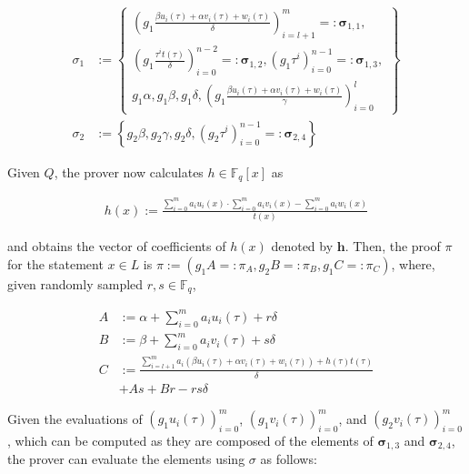 \documentclass{article}
\begin{document}
\begin{adjustbox}{max width=.5\textwidth}
\parbox{\linewidth}{
\begin{align*}
        \sigma_1 &:= \left\{\begin{aligned}\left(g_1\frac{\beta u_i(\tau) + \alpha v_i(\tau) + w_i(\tau)}{\delta}\right)_{i=l+1}^m =: \boldsymbol\sigma_{1,1},\\
        \left(g_1\frac{\tau^i t(\tau)}{\delta}\right)_{i=0}^{n-2} =: \boldsymbol\sigma_{1,2}, \left(g_1{\tau^i}\right)_{i=0}^{n-1} =: \boldsymbol\sigma_{1,3},\\
        g_1\alpha, g_1\beta, g_1\delta, \left(g_1\frac{\beta u_i(\tau) + \alpha v_i(\tau) + w_i(\tau)}{\gamma}\right)_{i=0}^l\end{aligned}\right\} \\
        \sigma_2 &:= \left\{g_2\beta, g_2\gamma, g_2\delta, (g_2{\tau^i})_{i=0}^{n-1} =: \boldsymbol\sigma_{2,4}\right\}
\end{align*}}
\end{adjustbox}

Given $Q$, the prover now calculates $h \in \mathbb{F}_q[x]$ as

\begin{align}h(x) := \frac{\sum_{i=0}^m a_iu_i(x) \cdot \sum_{i=0}^m a_iv_i(x) - \sum_{i=0}^{m} a_iw_i(x)}{t(x)} \label{eq:h}\end{align}

and obtains the vector of coefficients of $h(x)$ denoted by $\boldsymbol{h}$.
Then, the proof $\pi$ for the statement $x \in L$ is $\pi := (g_1A =: \pi_A, g_2B =: \pi_B, g_1C =: \pi_C)$, where, given randomly sampled $r,s\in \mathbb{F}_q$,

\begin{align}
        A &:= \alpha + \sum_{i=0}^m a_iu_i(\tau) + r\delta \label{eq:A} \\
        B &:= \beta + \sum_{i=0}^m a_iv_i(\tau) + s\delta \label{eq:B} \\
        C &:= \frac{\sum_{i=l+1}^m a_i(\beta u_i(\tau) + \alpha v_i(\tau) + w_i(\tau)) + h(\tau)t(\tau)}{\delta} \label{eq:C} \\
        & + As + Br - rs\delta \nonumber
\end{align}

Given the evaluations of $(g_1{u_i(\tau)})_{i=0}^m$, $(g_1{v_i(\tau)})_{i=0}^m$, and $(g_2{v_i(\tau)})_{i=0}^m$, which can be computed as they are composed of the elements of $\boldsymbol\sigma_{1,3}$ and $\boldsymbol\sigma_{2,4}$, the prover can evaluate the elements using $\sigma$ as follows:
\end{document}

